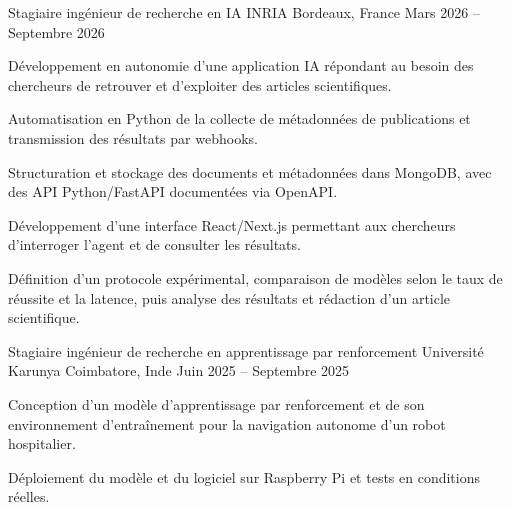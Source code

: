 
\begin{cventries}
  \cventry
    {Stagiaire ingénieur de recherche en IA}
    {INRIA}
    {Bordeaux, France}
    {Mars 2026 -- Septembre 2026}
    {
      \begin{cvitems}
        \item {Développement en autonomie d’une application IA répondant au besoin des chercheurs de retrouver et d’exploiter des articles scientifiques.}
        \item {Automatisation en Python de la collecte de métadonnées de publications et transmission des résultats par webhooks.}
        \item {Structuration et stockage des documents et métadonnées dans MongoDB, avec des API Python/FastAPI documentées via OpenAPI.}
        \item {Développement d’une interface React/Next.js permettant aux chercheurs d’interroger l’agent et de consulter les résultats.}
        \item {Définition d’un protocole expérimental, comparaison de modèles selon le taux de réussite et la latence, puis analyse des résultats et rédaction d’un article scientifique.}
      \end{cvitems}
    }

  \cventry
    {Stagiaire ingénieur de recherche en apprentissage par renforcement}
    {Université Karunya}
    {Coimbatore, Inde}
    {Juin 2025 -- Septembre 2025}
    {
      \begin{cvitems}
        \item {Conception d’un modèle d’apprentissage par renforcement et de son environnement d’entraînement pour la navigation autonome d’un robot hospitalier.}
        \item {Déploiement du modèle et du logiciel sur Raspberry Pi et tests en conditions réelles.}
      \end{cvitems}
    }
\end{cventries}
